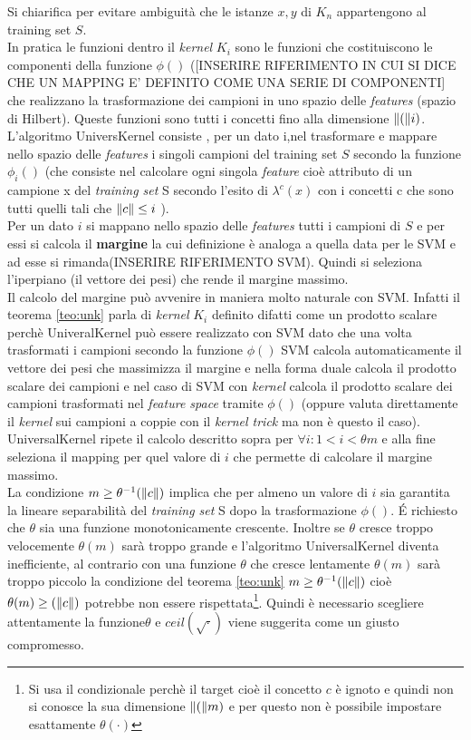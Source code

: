 Si chiarifica per evitare ambiguità che le istanze $x,y$ di $K_n$ appartengono al training set $S$. \\
In pratica le funzioni dentro il \textit{kernel} $K_i$ sono le funzioni che costituiscono le componenti della funzione $\phi()$ ([INSERIRE RIFERIMENTO IN CUI SI DICE CHE UN MAPPING E' DEFINITO COME UNA SERIE DI COMPONENTI] che realizzano la trasformazione dei campioni in uno spazio delle \textit{features} (spazio di Hilbert). Queste funzioni sono tutti i concetti fino alla dimensione $\lVert(\rVert i)$.  L'algoritmo UniversKernel consiste , per un dato i,nel trasformare e mappare nello spazio delle \textit{features} i singoli campioni del training set $S$ secondo la funzione $\phi_{i}()$ (che consiste nel calcolare ogni singola \textit{feature} cioè attributo di un campione x del \textit{training set} S secondo l'esito di $\lambda^{c}(x)$ con i concetti c che sono tutti quelli tali che $\lVert c\rVert \leq i$ ).\\
Per un dato $i$ si mappano nello spazio delle \textit{features} tutti i campioni di $S$ e per essi si calcola il \textbf{margine} la cui definizione è analoga a quella data per le \ac{SVM} e ad esse si rimanda(INSERIRE RIFERIMENTO SVM). Quindi si seleziona l'iperpiano (il vettore dei pesi) che rende il margine massimo.\\
Il calcolo del margine può avvenire in maniera molto naturale con \ac{SVM}. Infatti il teorema \ref{teo:unk} parla di \textit{kernel} $K_i$ definito difatti come un prodotto scalare perchè UniveralKernel può essere realizzato con \ac{SVM} dato che una volta trasformati i campioni secondo la funzione $\phi()$ \ac{SVM} calcola automaticamente il vettore dei pesi che massimizza il margine e nella  forma duale calcola il prodotto scalare dei campioni e nel caso di \ac{SVM} con \textit{kernel} calcola il prodotto scalare dei  campioni trasformati nel \textit{feature space} tramite $\phi()$ (oppure valuta direttamente il \textit{kernel} sui campioni a coppie con il \textit{kernel trick} ma non è questo il caso).\\
UniversalKernel ripete il calcolo descritto sopra per  $\forall i : 1<i<\theta{m}$ e alla fine seleziona il mapping per quel valore di $i$ che permette di calcolare il margine massimo.\\
La condizione $m \geq \theta^{-1}(\lVert c\rVert)$ implica che per almeno un valore di $i$ sia garantita la lineare separabilità del \textit{training set} S dopo la trasformazione $\phi()$. \'E richiesto che $\theta$ sia una funzione monotonicamente crescente. Inoltre se $\theta$ cresce troppo velocemente $\theta(m)$ sarà troppo grande e l'algoritmo UniversalKernel diventa inefficiente, al contrario con una funzione $\theta$ che cresce lentamente $\theta(m)$ sarà troppo piccolo la condizione del teorema \ref{teo:unk}  $m \geq  \theta^{-1}(\lVert c\rVert)$ cioè $\theta(m) \geq  (\lVert c\rVert)$ potrebbe non essere rispettata\footnote{Si usa il condizionale perchè il target cioè il concetto $c$ è ignoto e quindi non si conosce la sua dimensione $\lVert(\rVert m)$ e per questo non è possibile impostare esattamente $\theta(\cdot)$}. Quindi è necessario scegliere attentamente la funzione$\theta$ e $ceil(\sqrt{\cdot})$ viene suggerita come un giusto compromesso.

